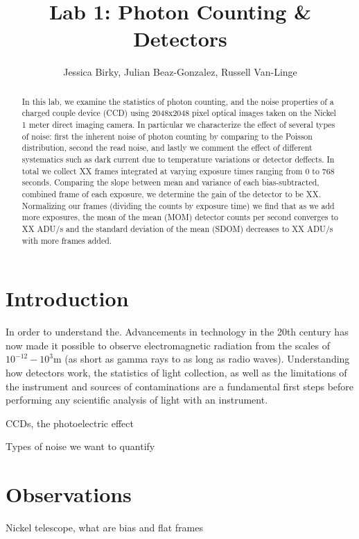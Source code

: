 \documentclass[preprint]{aastex62}
\begin{document}
\title{\sc Lab 1: Photon Counting \& Detectors}
\author{Jessica Birky, Julian Beaz-Gonzalez, Russell Van-Linge}


\begin{abstract}
In this lab, we examine the statistics of photon counting, and the noise properties of a charged couple device (CCD) using 2048x2048 pixel optical images taken on the Nickel 1 meter direct imaging camera. In particular we characterize the effect of several types of noise: first the inherent noise of photon counting by comparing to the Poisson distribution, second the read noise, and lastly we comment the effect of different systematics such as dark current due to temperature variations or detector deffects. In total we collect XX frames integrated at varying exposure times ranging from 0 to 768 seconds. Comparing the slope between mean and variance of each bias-subtracted, combined frame of each exposure, we determine the gain of the detector to be XX. Normalizing our frames (dividing the counts by exposure time) we find that as we add more exposures, the mean of the mean (MOM) detector counts per second converges to XX ADU/s and the standard deviation of the mean (SDOM) decreases to XX ADU/s with more frames added.

\end{abstract}
\bigskip

\section{Introduction} 
In order to understand the. Advancements in technology in the 20th century has now made it possible to observe electromagnetic radiation from the scales of $10^{-12}-10^3$m (as short as gamma rays to as long as radio waves). Understanding how detectors work, the statistics of light collection, as well as the limitations of the instrument and sources of contaminations are a fundamental first steps before performing any scientific analysis of light with an instrument.

CCDs, the photoelectric effect

Types of noise we want to quantify

\section{Observations}
Nickel telescope, what are bias and flat frames
\end{document}
